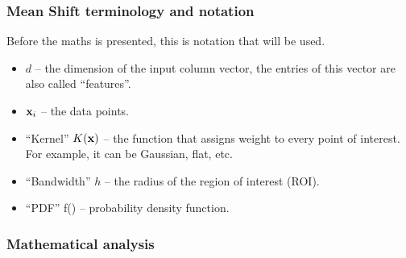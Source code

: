 \documentclass[a4paper]{article}
\begin{document}
\subsubsection{Mean Shift terminology and notation}

Before the maths is presented, this is notation that will be used.
\begin{itemize}
    \item $d$ -- the dimension of the input column vector, the entries of this vector are also called ``features''.
    \item $\textbf{x}_i$ -- the data points.
    \item ``Kernel'' $K(\textbf{x})$ -- the function that assigns weight to every point of interest. For example, it can be Gaussian, flat, etc.
    \item ``Bandwidth'' $h$ -- the radius of the region of interest (ROI).
    \item ``PDF'' f(\bx) -- probability density function.
\end{itemize}


\subsubsection{Mathematical analysis}
\end{document}
